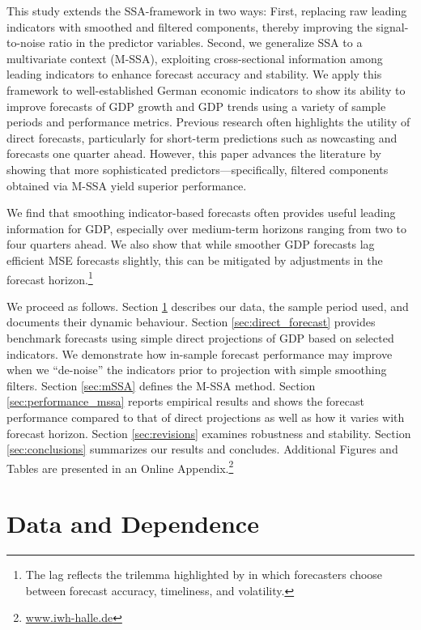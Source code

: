 \documentclass[11pt,a4paper]{article}
\begin{document}
This study extends the SSA-framework in two ways: First, replacing raw leading indicators with smoothed and filtered components, thereby improving the signal-to-noise ratio in the predictor variables. Second, we generalize SSA to a multivariate context (M-SSA), exploiting cross-sectional information among leading indicators to enhance forecast accuracy and stability. We apply this framework to well-established German economic indicators to show its ability to improve forecasts of GDP growth \citep{lehmann2021predicting,Heinisch2018bottom} and GDP trends using a variety of sample periods and performance metrics. Previous research often highlights the utility of direct forecasts, particularly for short-term predictions such as nowcasting and forecasts one quarter ahead. However, this paper advances the literature by showing that more sophisticated predictors—specifically, filtered components obtained via M-SSA yield superior performance.

We find that smoothing indicator-based forecasts often provides useful leading information for GDP, especially over medium-term horizons ranging from two to four quarters ahead. We also show that while smoother GDP forecasts lag efficient MSE forecasts slightly, this can be mitigated by adjustments in the forecast horizon.\footnote{The lag reflects the trilemma highlighted by \cite{McElroy2019} in which forecasters choose between forecast accuracy, timeliness, and volatility.}

We proceed as follows. Section \ref{sec:data} describes our data, the sample period used, and documents their dynamic behaviour. Section \ref{sec:direct_forecast} provides benchmark forecasts using simple direct projections of GDP based on selected indicators. We demonstrate how in-sample forecast performance may improve when we ``de-noise'' the indicators prior to projection with simple smoothing filters. Section \ref{sec:mSSA} defines the M-SSA method. 
Section \ref{sec:performance_mssa} reports empirical results and shows the forecast performance compared to that of direct projections as well as how it varies with forecast horizon. 
Section \ref{sec:revisions} examines robustness and stability. Section \ref{sec:conclusions} summarizes our results and concludes. Additional Figures and Tables are presented in an Online Appendix.\footnote{\url{www.iwh-halle.de}}


\section{Data and Dependence}\label{sec:data}
\end{document}
